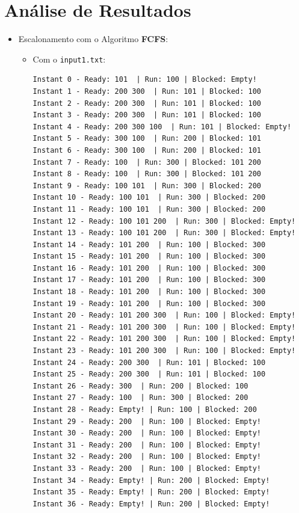 \documentclass[11pt]{article}   %
\begin{document}
\section{Análise de Resultados} %
\begin{itemize}
    \item Escalonamento com o Algoritmo \textbf{FCFS}:
    \begin{itemize}
        \item Com o \verb|input1.txt|:
        \begin{verbatim}
Instant 0 - Ready: 101  | Run: 100 | Blocked: Empty!
Instant 1 - Ready: 200 300  | Run: 101 | Blocked: 100 
Instant 2 - Ready: 200 300  | Run: 101 | Blocked: 100 
Instant 3 - Ready: 200 300  | Run: 101 | Blocked: 100 
Instant 4 - Ready: 200 300 100  | Run: 101 | Blocked: Empty!
Instant 5 - Ready: 300 100  | Run: 200 | Blocked: 101 
Instant 6 - Ready: 300 100  | Run: 200 | Blocked: 101 
Instant 7 - Ready: 100  | Run: 300 | Blocked: 101 200 
Instant 8 - Ready: 100  | Run: 300 | Blocked: 101 200 
Instant 9 - Ready: 100 101  | Run: 300 | Blocked: 200 
Instant 10 - Ready: 100 101  | Run: 300 | Blocked: 200 
Instant 11 - Ready: 100 101  | Run: 300 | Blocked: 200 
Instant 12 - Ready: 100 101 200  | Run: 300 | Blocked: Empty!
Instant 13 - Ready: 100 101 200  | Run: 300 | Blocked: Empty!
Instant 14 - Ready: 101 200  | Run: 100 | Blocked: 300 
Instant 15 - Ready: 101 200  | Run: 100 | Blocked: 300 
Instant 16 - Ready: 101 200  | Run: 100 | Blocked: 300 
Instant 17 - Ready: 101 200  | Run: 100 | Blocked: 300 
Instant 18 - Ready: 101 200  | Run: 100 | Blocked: 300 
Instant 19 - Ready: 101 200  | Run: 100 | Blocked: 300 
Instant 20 - Ready: 101 200 300  | Run: 100 | Blocked: Empty!
Instant 21 - Ready: 101 200 300  | Run: 100 | Blocked: Empty!
Instant 22 - Ready: 101 200 300  | Run: 100 | Blocked: Empty!
Instant 23 - Ready: 101 200 300  | Run: 100 | Blocked: Empty!
Instant 24 - Ready: 200 300  | Run: 101 | Blocked: 100 
Instant 25 - Ready: 200 300  | Run: 101 | Blocked: 100 
Instant 26 - Ready: 300  | Run: 200 | Blocked: 100 
Instant 27 - Ready: 100  | Run: 300 | Blocked: 200 
Instant 28 - Ready: Empty! | Run: 100 | Blocked: 200 
Instant 29 - Ready: 200  | Run: 100 | Blocked: Empty!
Instant 30 - Ready: 200  | Run: 100 | Blocked: Empty!
Instant 31 - Ready: 200  | Run: 100 | Blocked: Empty!
Instant 32 - Ready: 200  | Run: 100 | Blocked: Empty!
Instant 33 - Ready: 200  | Run: 100 | Blocked: Empty!
Instant 34 - Ready: Empty! | Run: 200 | Blocked: Empty!
Instant 35 - Ready: Empty! | Run: 200 | Blocked: Empty!
Instant 36 - Ready: Empty! | Run: 200 | Blocked: Empty!    
    

\end{verbatim}
\end{itemize}
\end{itemize}
\end{document}
